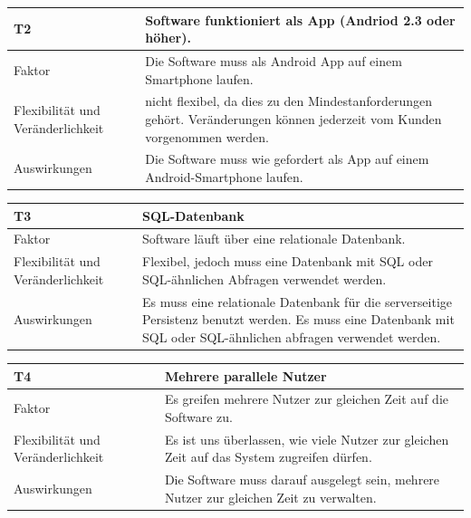 \documentclass[fontsize=12pt,paper=a4,twoside]{scrartcl}
\begin{document}
\begin{table}[H]
\begin{tabular}{|p{3cm}|p{12cm}|}\hline
\textbf{T2} & \textbf{Software funktioniert als App (Andriod 2.3 oder höher)}. \\ \hline \hline
Faktor & Die Software muss als Android App auf einem Smartphone laufen.\\ \hline
Flexibilität und Veränderlichkeit & nicht flexibel, da dies zu den Mindestanforderungen gehört. Veränderungen können jederzeit vom Kunden vorgenommen werden.  \\ \hline
Auswirkungen & Die Software muss wie gefordert als App auf einem Android-Smartphone laufen.\\ \hline
\end{tabular}
\end{table}


\begin{table}[H]
\begin{tabular}{|p{3cm}|p{12cm}|}\hline
\textbf{T3} & \textbf{SQL-Datenbank} \\ \hline \hline
Faktor & Software läuft über eine relationale Datenbank.\\ \hline
Flexibilität und Veränderlichkeit & Flexibel, jedoch muss eine Datenbank mit SQL oder SQL-ähnlichen Abfragen verwendet werden.  \\ \hline
Auswirkungen & Es muss eine relationale Datenbank für die serverseitige Persistenz benutzt werden. Es muss eine Datenbank mit SQL oder SQL-ähnlichen abfragen verwendet werden.\\ \hline
\end{tabular}
\end{table}

\begin{table}[H]
\begin{tabular}{|p{3cm}|p{12cm}|}\hline
\textbf{T4} & \textbf{Mehrere parallele Nutzer} \\ \hline \hline
Faktor & Es greifen mehrere Nutzer zur gleichen Zeit auf die Software zu.\\ \hline
Flexibilität und Veränderlichkeit & Es ist uns überlassen, wie viele Nutzer zur gleichen Zeit auf das System zugreifen dürfen.  \\ \hline
Auswirkungen & Die Software muss darauf ausgelegt sein, mehrere Nutzer zur gleichen Zeit zu verwalten.\\ \hline
\end{tabular}
\end{table}
\end{document}
